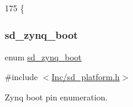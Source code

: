 \begin{DoxyCode}
175                     \{
\end{DoxyCode}
\mbox{\label{group___s_d___platform_ga06667de95c86bfcdef8bcc8ab13cb2d4}} 
\subsubsection{\texorpdfstring{sd\+\_\+zynq\+\_\+boot}{sd\_zynq\_boot}}
{\footnotesize\ttfamily enum \mbox{\hyperlink{group___s_d___platform_ga06667de95c86bfcdef8bcc8ab13cb2d4}{sd\+\_\+zynq\+\_\+boot}}}



{\ttfamily \#include $<$\mbox{\hyperlink{sd__platform_8h}{Inc/sd\+\_\+platform.\+h}}$>$}



Zynq boot pin enumeration. 

